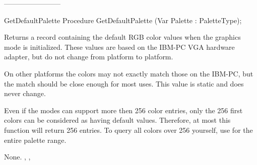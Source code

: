 ------------------------
\begin{procedure}{GetDefaultPalette}
\Declaration
Procedure GetDefaultPalette (Var Palette : PaletteType);

\Description
Returns a  record containing the default RGB color
values when the graphics mode is initialized. These values are based
on the IBM-PC VGA hardware adapter, but do not change from platform
to platform.

On other platforms the colors may not exactly match those
on the IBM-PC, but the match should be close enough for most uses. This
value is static and does never change.

Even if the modes can support more then 256 color entries, only the
256 first colors can be considered as having default values. Therefore,
at most this function will return 256 entries. To query all colors over
256 yourself, use  for the entire palette range.

\Errors
None.
\SeeAlso
{}, , 
\end{procedure}


